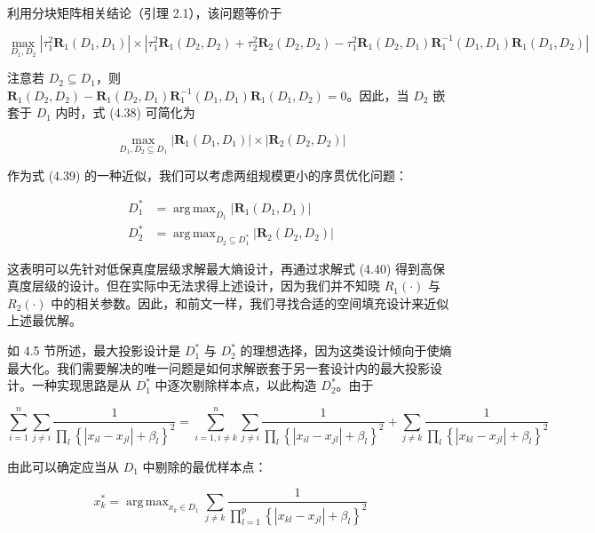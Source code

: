 \documentclass{ctexart}
\DeclareMathOperator*{\argmax}{arg\,max}
\begin{document}
利用分块矩阵相关结论（引理 2.1），该问题等价于

\begin{equation*}
\max_{D_1,D_2}\left|\tau_1^2 \boldsymbol{R}_1(D_1,D_1)\right|\times
\left|\tau_1^2 \boldsymbol{R}_1(D_2,D_2)+\tau_2^2 \boldsymbol{R}_2(D_2,D_2)-\tau_1^2 \boldsymbol{R}_1(D_2,D_1)\boldsymbol{R}_1^{-1}(D_1,D_1)\boldsymbol{R}_1(D_1,D_2)\right|
\tag{4.38}
\end{equation*}

注意若 $D_2 \subseteq D_1$，则 $\boldsymbol{R}_1(D_2,D_2)-\boldsymbol{R}_1(D_2,D_1)\boldsymbol{R}_1^{-1}(D_1,D_1)\boldsymbol{R}_1(D_1,D_2)=0$。因此，当 $D_2$ 嵌套于 $D_1$ 内时，式 (4.38) 可简化为

\begin{equation*}
\max_{D_1,D_2\subseteq D_1} \left|\boldsymbol{R}_1(D_1,D_1)\right| \times \left|\boldsymbol{R}_2(D_2,D_2)\right|
\tag{4.39}
\end{equation*}

作为式 (4.39) 的一种近似，我们可以考虑两组规模更小的序贯优化问题：

\begin{align*}
D_1^* &= \argmax_{D_1}\left|\boldsymbol{R}_1(D_1,D_1)\right|\\
D_2^* &= \argmax_{D_2\subseteq D_1^*}\left|\boldsymbol{R}_2(D_2,D_2)\right|\tag{4.40}
\end{align*}

这表明可以先针对低保真度层级求解最大熵设计，再通过求解式 (4.40) 得到高保真度层级的设计。但在实际中无法求得上述设计，因为我们并不知晓 $R_1(\cdot)$ 与 $R_2(\cdot)$ 中的相关参数。因此，和前文一样，我们寻找合适的空间填充设计来近似上述最优解。

如 4.5 节所述，最大投影设计是 $D^*_1$ 与 $D^*_2$ 的理想选择，因为这类设计倾向于使熵最大化。我们需要解决的唯一问题是如何求解嵌套于另一套设计内的最大投影设计。一种实现思路是从 $D^*_1$ 中逐次剔除样本点，以此构造 $D^*_2$。由于

\begin{equation*}
\sum_{i=1}^{n}\sum_{j\neq i}\frac{1}{\prod_{l}\left\{\left|x_{il}-x_{jl}\right|+\beta_{l}\right\}^{2}}
=\sum_{i=1,i\neq k}^{n}\sum_{j\neq i}\frac{1}{\prod_{l}\left\{\left|x_{il}-x_{jl}\right|+\beta_{l}\right\}^{2}}
+\sum_{j\neq k}\frac{1}{\prod_{l}\left\{\left|x_{kl}-x_{jl}\right|+\beta_{l}\right\}^{2}}
\end{equation*}

由此可以确定应当从 $D_1$ 中剔除的最优样本点：

\begin{equation*}
x^*_k=\argmax_{x_k\in D_1}\sum_{j\neq k}\frac{1}{\prod_{l=1}^{p}\left\{\left|x_{kl}-x_{jl}\right|+\beta_{l}\right\}^{2}}
\tag{4.41}
\end{equation*}
\end{document}
